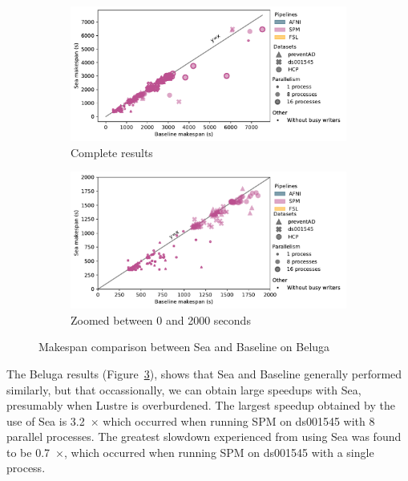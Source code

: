 \begin{figure}

\begin{subfigure}{\textwidth}
    \centering
    \captionsetup{width=.85\linewidth}
    \includegraphics[width=\columnwidth]{figures/sea-neuro/beluga_sea_all.pdf}%
    \caption{Complete results}\label{fig:seaneuro:belugafull}
\end{subfigure}
\begin{subfigure}{\textwidth}
    \centering
    \captionsetup{width=.85\linewidth}
    \includegraphics[width=\linewidth]{figures/sea-neuro/beluga_sea_zoom.pdf}
    \caption{Zoomed between 0 and 2000 seconds}\label{fig:seaneuro:belugazoom}
\end{subfigure}
\caption{Makespan comparison between Sea and Baseline on Beluga}
\label{fig:seaneuro:beluga}
\end{figure}

The Beluga results (Figure~\ref{fig:seaneuro:beluga}), 
shows that Sea and Baseline generally performed 
similarly, but that occassionally, we can obtain large 
speedups with Sea, presumably when Lustre is 
overburdened. The largest speedup obtained by the use of
Sea is 3.2~$\times$ which occurred when running SPM on ds001545 with 8 parallel processes. The greatest
slowdown experienced from using Sea was found to be 0.7~$\times$, which occurred when running SPM on ds001545 with a single process. 

